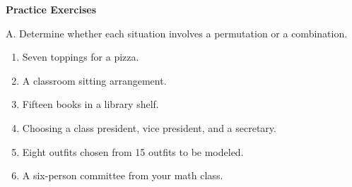 \textbf{Practice Exercises}

\vspce

A. Determine whether each situation involves a permutation or a combination.
\begin{enumerate}[label = \arabic*. ]
\item Seven toppings for a pizza. 
\item A classroom sitting arrangement. 
\item Fifteen  books in a library shelf. 
\item Choosing a class president, vice president, and a secretary. 
\item Eight outfits chosen from 15 outfits to be modeled. 
\item A six-person committee from your math class. 

\end{enumerate}   

   


